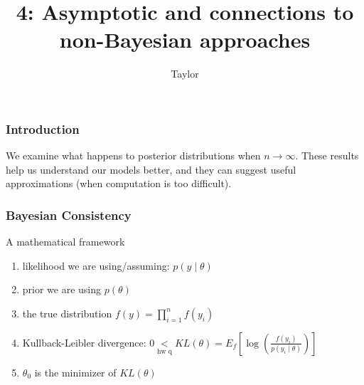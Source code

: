 \documentclass{beamer}
\title["4"]{4: Asymptotic and connections to non-Bayesian approaches}
\author{Taylor}
\institute[UVA] 
{
University of Virginia \\
\medskip
\textit{} 
}
\date{}
\begin{document}

\begin{frame}
\titlepage 
\end{frame}

\begin{frame}
\frametitle{Introduction}

We examine what happens to posterior distributions when $n \to \infty$. These results help us understand our models better, and they can suggest useful approximations (when computation is too difficult).
\newline


\end{frame}
\begin{frame}
\frametitle{Bayesian Consistency}

A mathematical framework
\begin{enumerate}
\item likelihood we are using/assuming: $p(y \mid \theta)$
\item prior we are using $p(\theta)$
\item the true distribution $f(y) = \prod_{i=1}^n f(y_i)$
\item Kullback-Leibler divergence: $0 \underset{\text{hw q}}{<} KL(\theta) = E_f\left[\log\left(\frac{ f(y_i) }{p(y_i \mid \theta) } \right) \right]$
\item $\theta_0$ is the minimizer of $KL(\theta)$
\end{enumerate}

\end{frame}
\end{document}
